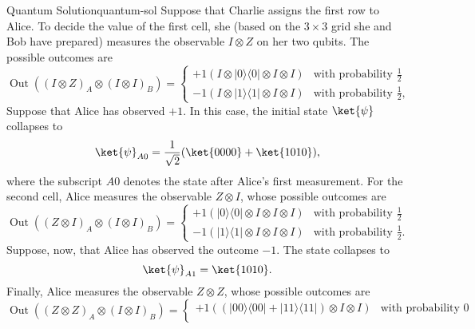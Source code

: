 \documentclass{llncs}
\newcommand{\ketbra}[2]{\ensuremath{| #1 \rangle \langle #2 |}}
\begin{document}
\begin{tcbexample}{Quantum Solution}{quantum-sol}
  Suppose that Charlie assigns the first row to Alice. To decide the
  value of the first cell, she (based on the \(3 \times 3\) grid she
  and Bob have prepared) measures the observable \(I \otimes Z\)
  on her two qubits. The possible outcomes are
  \begin{equation}
    \operatorname{Out}((I \otimes Z)_{A} \otimes (I \otimes I)_{B}) =
    \begin{cases}
      +1 \left(I \otimes \ketbra{0}{0} \otimes I \otimes I\right)
        &\text{with probability } \frac{1}{2} \\
      -1 \left(I \otimes \ketbra{1}{1} \otimes I \otimes I\right)
        &\text{with probability } \frac{1}{2},
    \end{cases}
  \end{equation}
  Suppose that Alice has observed \(+1\). In this case, the initial
  state \(\ket{\psi}\) collapses to
  \begin{equation}
    \ket{\psi}_{A0} =  \frac{1}{\sqrt{2}}(\ket{0000} + \ket{1010}),
  \end{equation}
  where the subscript \(A0\) denotes the state after Alice's first
  measurement.  For the second cell, Alice measures the observable
  \(Z \otimes I\), whose possible outcomes are
  \begin{equation}
    \operatorname{Out}((Z \otimes I)_{A} \otimes (I \otimes I)_{B}) =
    \begin{cases}
      +1 \left(\ketbra{0}{0} \otimes I \otimes I \otimes I\right)
        &\text{with probability } \frac{1}{2} \\
      -1 \left(\ketbra{1}{1} \otimes I \otimes I \otimes I\right)
        &\text{with probability } \frac{1}{2}.
    \end{cases}
  \end{equation}
  Suppose, now, that Alice has observed the outcome \(-1\). The state
  collapses to
  \begin{equation}
    \ket{\psi}_{A1} =  \ket{1010}.
  \end{equation}
  Finally, Alice measures the observable \(Z \otimes Z\), whose
  possible outcomes are
  \begin{equation}
    \operatorname{Out}((Z \otimes Z)_{A} \otimes (I \otimes I)_{B}) =
    \begin{cases}
      +1 \left(\left(\ketbra{00}{00} + \ketbra{11}{11}\right) \otimes I \otimes I\right)
      &\text{with probability } 0 \\

\end{cases}
\end{equation}
\end{tcbexample}
\end{document}
